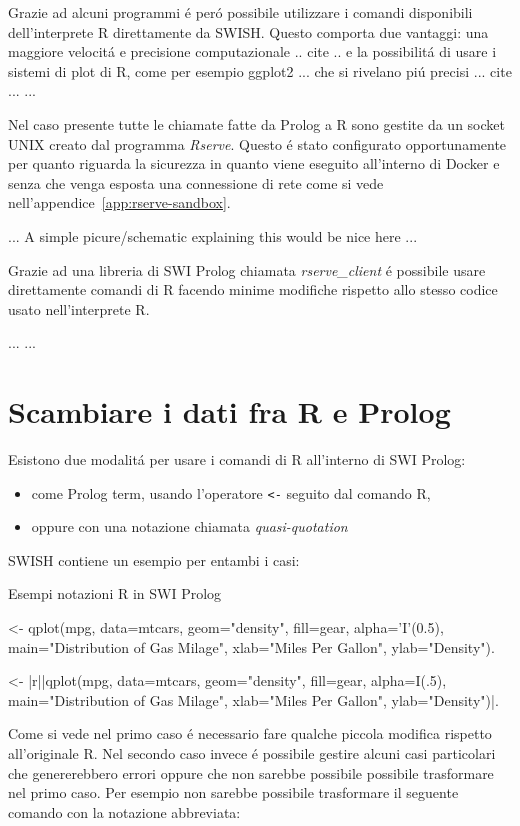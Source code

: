 \documentclass[10pt,titlepage,twoside,a4paper]{report}
\newenvironment{code}{\singlespacing\captionsetup{type=listing}}{}
\begin{document}
Grazie ad alcuni programmi \'e per\'o possibile utilizzare i comandi 
disponibili dell'interprete R direttamente da SWISH. Questo comporta due 
vantaggi: una maggiore velocit\'a e precisione computazionale .. cite .. e la 
possibilit\'a di usare i sistemi di plot di R, come per esempio ggplot2 ...
che si rivelano pi\'u precisi ... cite ... ...

Nel caso presente tutte le chiamate fatte da Prolog a R sono gestite da un 
socket UNIX creato dal programma \emph{Rserve}\cite{rserve}. Questo \'e stato 
configurato opportunamente per quanto riguarda la sicurezza in quanto viene 
eseguito all'interno di Docker e senza che venga esposta una connessione di 
rete come si vede nell'appendice~\ref{app:rserve-sandbox}.

... A simple picure/schematic explaining this would be nice here ...

Grazie ad una libreria di SWI Prolog chiamata 
\emph{rserve\_client}\cite{rserveclient} 
\'e possibile usare direttamente comandi di R facendo minime modifiche 
rispetto allo stesso codice usato nell'interprete R.

... ...

\section{Scambiare i dati fra R e Prolog}
Esistono due modalit\'a per usare i comandi di R all'interno di SWI Prolog:
\begin{itemize}
    \item come Prolog term, usando l'operatore \texttt{<-} seguito dal comando R,
    \item oppure con una notazione chiamata \emph{quasi-quotation}
\end{itemize}
SWISH contiene un esempio per entambi i casi\cite{rprolognotations}:

\begin{code}
    \caption{Esempi notazioni R in SWI Prolog}
    \begin{prologcode*}{}
<- qplot(mpg, data=mtcars, geom="density", fill=gear, alpha='I'(0.5), main="Distribution of Gas Milage", xlab="Miles Per Gallon", ylab="Density").

<- {|r||qplot(mpg, data=mtcars, geom="density", fill=gear, alpha=I(.5), main="Distribution of Gas Milage", xlab="Miles Per Gallon", ylab="Density")|}.
    \end{prologcode*}
\end{code}

Come si vede nel primo caso \'e necessario fare qualche piccola modifica 
rispetto all'originale R. Nel secondo caso invece \'e possibile gestire alcuni 
casi particolari che genererebbero errori oppure che non sarebbe possibile 
possibile trasformare nel primo caso. Per esempio non sarebbe possibile 
trasformare il seguente comando con la notazione abbreviata:
\end{document}
